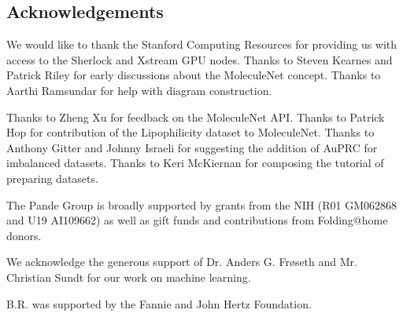 \subsection{Acknowledgements}
We would like to thank the Stanford Computing Resources for providing us with access to the Sherlock and Xstream GPU nodes. Thanks to Steven Kearnes and Patrick Riley for early discussions about the MoleculeNet concept. Thanks to Aarthi Ramsundar for help with diagram construction.

Thanks to Zheng Xu for feedback on the MoleculeNet API. Thanks to Patrick Hop for contribution of the Lipophilicity dataset to MoleculeNet. Thanks to Anthony Gitter and Johnny Israeli for suggesting the addition of AuPRC for imbalanced datasets. Thanks to Keri McKiernan for composing the tutorial of preparing datasets.

The Pande Group is broadly supported by grants from the NIH (R01 GM062868 and U19 AI109662) as well as gift funds and contributions from Folding@home donors. 


We acknowledge the generous support of Dr. Anders G. Fr{\o}seth and Mr. Christian Sundt for our work on machine learning.

B.R. was supported by the Fannie and John Hertz Foundation.






%
